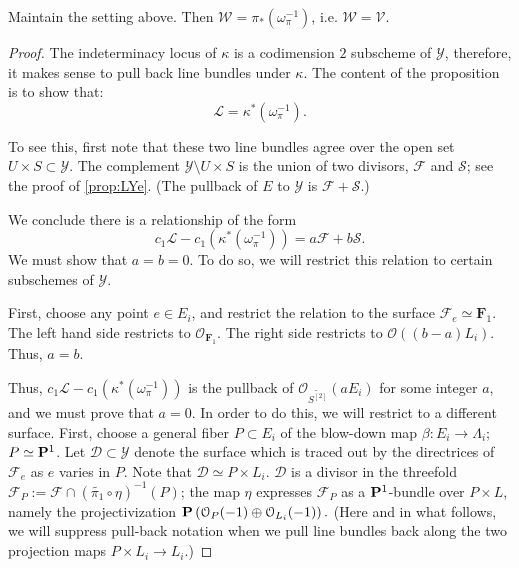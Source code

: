 \documentclass[12pt,reqno]{amsart}
\renewcommand{\to}{{\longrightarrow}}
\numberwithin{equation}{section}
\renewcommand{\O}{\mathcal O}
\newcommand{\F}{\mathbf F}
\newcommand{\td}{\widetilde}
\newcommand{\V}{\mathcal V}
\begin{document}
\begin{proposition}
  \label{prop:whyE} Maintain the setting above.  Then
  $\mathcal{W} = \pi_{*}\left( \omega_{\pi}^{-1} \right)$,
  i.e. $\mathcal{W} = \V$.
\end{proposition}

\begin{proof}
  The indeterminacy locus of $\kappa$ is a codimension $2$ subscheme
  of $\mathcal{Y}$, therefore, it makes sense to pull back line
  bundles under $\kappa$.  The content of the proposition is to show that:
  \[ \mathcal{L} = \kappa^{*}\left( \omega_{\pi}^{-1} \right).\]

  To see this, first note that these two line bundles agree over the
  open set $U \times S \subset \mathcal{Y}$.  The complement
  $\mathcal{Y} \setminus U \times S$ is the union of two divisors,
  $\mathcal{F}$ and $\mathcal{S}$; see the proof of
  \autoref{prop:LYe}.  (The pullback of $E$ to $\mathcal{Y}$ is
  $\mathcal{F} + \mathcal{S}$.)

   We conclude there is a relationship of the form
   \[c_{1} \mathcal{L} - c_{1} \left( \kappa^{*}\left(
         \omega_{\pi}^{-1} \right) \right) = a\mathcal{F} +
     b\mathcal{S}.\] We must show that $a = b = 0$.  To do so, we will
   restrict this relation to certain subschemes of $\mathcal{Y}$.

  First, choose any point $e \in E_{i}$, and restrict the relation to
  the surface $\mathcal{F}_{e} \simeq \F_{1}$.  The left hand side
  restricts to $\O_{\F_{1}}$.  The right side restricts to
  $\O\left( (b-a)L_{i} \right)$.  Thus, $a=b$.

  Thus,
  $c_{1} \mathcal{L} - c_{1} \left( \kappa^{*}\left( \omega_{\pi}^{-1}
    \right) \right)$ is the pullback of $\O_{\td{S^{[2]}}}(aE_{i})$
  for some integer $a$, and we must prove that $a = 0$.  In order to
  do this, we will restrict to a different surface.  First, choose a
  general fiber $P \subset E_{i}$ of the blow-down map
  $\beta: E_{i} \to \Lambda_{i}$; $P \simeq \P^{1}$.  Let
  $\mathcal{D} \subset \mathcal{Y}$ denote the surface which is traced
  out by the directrices of $\mathcal{F}_{e}$ as $e$ varies in $P$.
  Note that $\mathcal{D} \simeq P \times L_{i}$.  $\mathcal{D}$ is a
  divisor in the threefold
  $\mathcal{F}_{P} := \mathcal{F} \cap (\td{\pi_{1}} \circ
  \eta)^{-1}(P)$; the map $\eta$ expresses $\mathcal{F}_{P}$ as a
  $\P^{1}$-bundle over $P \times L$, namely the projectivization
  $\P \left( \O_{P}(-1) \oplus \O_{L_{i}}(-1) \right).$ (Here and in
  what follows, we will suppress pull-back notation when we pull line
  bundles back along the two projection maps
  $P \times L_{i} \to L_{i}$.)


\end{proof}
\end{document}
